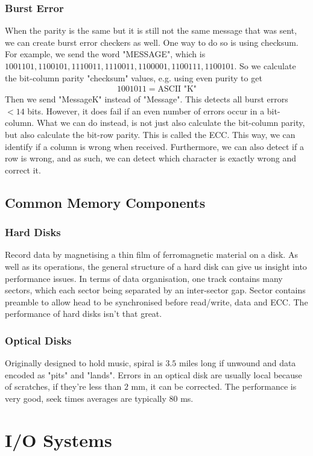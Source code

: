 \documentclass[a4paper]{article}
\theoremstyle{plain}
\theoremstyle{definition}
\theoremstyle{remark}
\begin{document}
\subsubsection{Burst Error}
When the parity is the same but it is still not the same message that was sent, we can create burst error checkers as well. One way to do so is using checksum. For example, we send the word "MESSAGE", which is $1001101, 1100101, 1110011,1110011,1100001,1100111,1100101$. So we calculate the bit-column parity "checksum" values, e.g. using even purity to get
 \begin{align*}
	1001011 = \text{ASCII "K"}
\end{align*}
Then we send "MessageK" instead of "Message". This detects all burst errors $<14$ bits. However, it does fail if an even number of errors occur in a bit-column. What we can do instead, is not just also calculate the bit-column parity, but also calculate the bit-row parity. This is called the ECC. This way, we can identify if a column is wrong when received. Furthermore, we can also detect if a row is wrong, and as such, we can detect which character is exactly wrong and correct it.
\subsection{Common Memory Components}
\subsubsection{Hard Disks}
Record data by magnetising a thin film of ferromagnetic material on a disk. As well as its operations, the general structure of a hard disk can give us insight into performance issues. In terms of data organisation, one track contains many sectors, which each sector being separated by an inter-sector gap. Sector contains preamble to allow head to be synchronised before read/write, data and ECC. The performance of hard disks isn't that great.
\subsubsection{Optical Disks}
Originally designed to hold music, spiral is $3.5$ miles long if unwound and data encoded as "pits" and "lands". Errors in an optical disk are usually local because of scratches, if they're less than $2$ mm, it can be corrected. The performance is very good, seek times averages are typically $80$ ms.
\section{I/O Systems}
\end{document}
